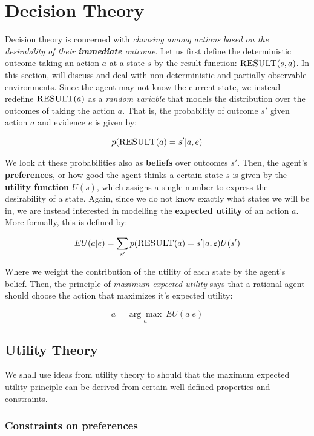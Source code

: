 \documentclass[11pt]{article}
\begin{document}
\pagebreak
\section{Decision Theory}

Decision theory is concerned with \textit{choosing among actions based on the desirability of their \textbf{immediate} outcome}. Let us first define the deterministic outcome taking an action $a$ at a state $s$ by the result function: $\textsc{RESULT}(s, a)$. In this section, will discuss and deal with non-deterministic and partially observable environments. Since the agent may not know the current state, we instead redefine $\textsc{RESULT}(a)$ as a \textit{random variable} that models the distribution over the outcomes of taking the action $a$. That is, the probability of outcome $s'$ given action $a$ and evidence $e$ is given by:

$$
p(\textsc{RESULT}(a) = s' | a, e)
$$

We look at these probabilities also as \textbf{beliefs} over outcomes $s'$. Then, the agent's \textbf{preferences}, or how good the agent thinks a certain state $s$ is given by the \textbf{utility function $U(s)$}, which assigns a single number to express the desirability of a state. Again, since we do not know exactly what states we will be in, we are instead interested in modelling the \textbf{expected utility} of an action $a$. More formally, this is defined by:

$$
EU(a|e) = \sum_{s'}p(\textsc{RESULT}(a) = s' | a, e) U(s')
$$

Where we weight the contribution of the utility of each state by the agent's belief. Then, the principle of \textit{maximum expected utility} says that a rational agent should choose the action that maximizes it's expected utility:

$$
a = \underset{a}{\arg\max} \ EU(a | e)
$$

\subsection{Utility Theory}

We shall use ideas from utility theory to should that the maximum expected utility principle can be derived from certain well-defined properties and constraints.

\subsubsection{Constraints on preferences}
\end{document}
